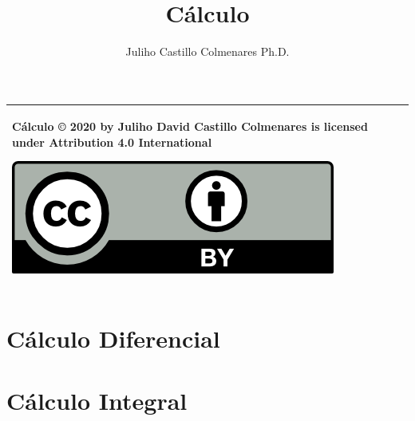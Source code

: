\documentclass{tufte-book}
\title{Cálculo}
\author[github.com/julihocc]{Juliho Castillo Colmenares Ph.D.}
\begin{document}
	\maketitle
\begin{tabular}{|p{}|}
	\hline
Cálculo © 2020 by Juliho David Castillo Colmenares is licensed under Attribution 4.0 International
	\begin{center}
		\includegraphics[scale=1]{./licencia/by.png}
	\end{center}\\
	\hline
\end{tabular}
\tableofcontents

\chapter{Cálculo Diferencial}









\chapter{Cálculo Integral}








\end{document}
